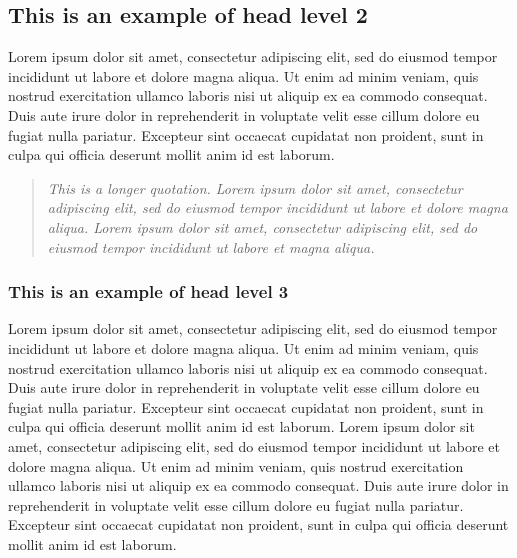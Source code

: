 \documentclass[english]{sbc2025}%
\begin{document}
\subsection{This is an example of head level 2}
Lorem ipsum dolor sit amet, consectetur adipiscing elit, sed do eiusmod tempor incididunt ut labore et dolore magna aliqua. Ut enim ad minim veniam, quis nostrud exercitation ullamco laboris nisi ut aliquip ex ea commodo consequat. Duis aute irure dolor in reprehenderit in voluptate velit esse cillum dolore eu fugiat nulla pariatur. Excepteur sint occaecat cupidatat non proident, sunt in culpa qui officia deserunt mollit anim id est laborum.

\begin{quotation}
\textit{This is a longer quotation. Lorem ipsum dolor sit amet, consectetur adipiscing elit, sed do eiusmod tempor incididunt ut labore et dolore magna aliqua. Lorem ipsum dolor sit amet, consectetur adipiscing elit, sed do eiusmod tempor incididunt ut labore et magna aliqua. 
}\end{quotation} 

\subsubsection{This is an example of head level 3}
Lorem ipsum dolor sit amet, consectetur adipiscing elit, sed do eiusmod tempor incididunt ut labore et dolore magna aliqua. Ut enim ad minim veniam, quis nostrud exercitation ullamco laboris nisi ut aliquip ex ea commodo consequat. Duis aute irure dolor in reprehenderit in voluptate velit esse cillum dolore eu fugiat nulla pariatur. Excepteur sint occaecat cupidatat non proident, sunt in culpa qui officia deserunt mollit anim id est laborum. Lorem ipsum dolor sit amet, consectetur adipiscing elit, sed do eiusmod tempor incididunt ut labore et dolore magna aliqua. Ut enim ad minim veniam, quis nostrud exercitation ullamco laboris nisi ut aliquip ex ea commodo consequat. Duis aute irure dolor in reprehenderit in voluptate velit esse cillum dolore eu fugiat nulla pariatur. Excepteur sint occaecat cupidatat non proident, sunt in culpa qui officia deserunt mollit anim id est laborum.
\end{document}
